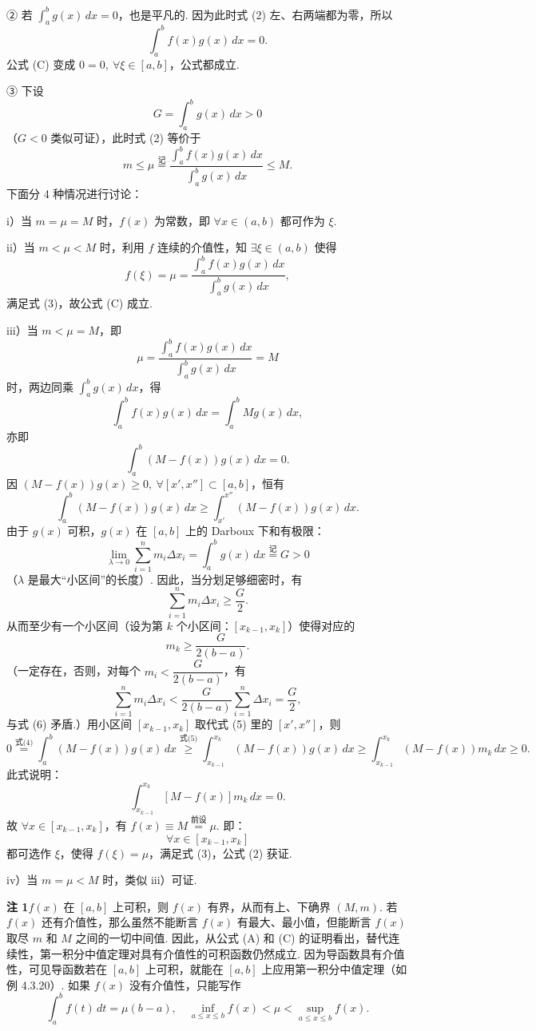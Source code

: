 \documentclass[UTF8,12pt,a4paper,fontset=fandol]{ctexart}
\begin{document}
② 若 $\displaystyle\int_a^b g(x)\,dx=0$，也是平凡的. 因为此时式 (2) 左、右两端都为零，所以
\[
\int_a^b f(x)g(x)\,dx=0.
\]
公式 (C) 变成 $0=0,\ \forall\xi\in[a,b]$，公式都成立.

③ 下设
\[
G=\int_a^b g(x)\,dx>0
\]
（$G<0$ 类似可证），此时式 (2) 等价于
\[
m\le \mu\stackrel{\text{记}}{=}
\frac{\displaystyle\int_a^b f(x)g(x)\,dx}{\displaystyle\int_a^b g(x)\,dx}\le M.
\tag{3}
\]
下面分 4 种情况进行讨论：

i）当 $m=\mu=M$ 时，$f(x)$ 为常数，即 $\forall x\in(a,b)$ 都可作为 $\xi$.

ii）当 $m<\mu<M$ 时，利用 $f$ 连续的介值性，知 $\exists\xi\in(a,b)$ 使得
\[
f(\xi)=\mu=
\frac{\displaystyle\int_a^b f(x)g(x)\,dx}{\displaystyle\int_a^b g(x)\,dx},
\]
满足式 (3)，故公式 (C) 成立.

iii）当 $m<\mu=M$，即
\[
\mu=\frac{\displaystyle\int_a^b f(x)g(x)\,dx}{\displaystyle\int_a^b g(x)\,dx}=M
\]
时，两边同乘 $\displaystyle\int_a^b g(x)\,dx$，得
\[
\int_a^b f(x)g(x)\,dx=\int_a^b Mg(x)\,dx,
\]
亦即
\[
\int_a^b(M-f(x))g(x)\,dx=0.
\tag{4}
\]
因 $(M-f(x))g(x)\ge0,\ \forall[x',x'']\subset[a,b]$，恒有
\[
\int_a^b(M-f(x))g(x)\,dx\ge
\int_{x'}^{x''}(M-f(x))g(x)\,dx.
\tag{5}
\]
由于 $g(x)$ 可积，$g(x)$ 在 $[a,b]$ 上的 Darboux 下和有极限：
\[
\lim_{\lambda\to0}\sum_{i=1}^n m_i\Delta x_i
=\int_a^b g(x)\,dx\stackrel{\text{记}}{=}G>0
\]
（$\lambda$ 是最大“小区间”的长度）. 因此，当分划足够细密时，有
\[
\sum_{i=1}^n m_i\Delta x_i\ge\frac G2.
\tag{6}
\]
从而至少有一个小区间（设为第 $k$ 个小区间：$[x_{k-1},x_k]$）使得对应的
\[
m_k\ge\frac{G}{2(b-a)}.
\tag{7}
\]
（一定存在，否则，对每个 $m_i<\dfrac{G}{2(b-a)}$，有
\[
\sum_{i=1}^n m_i\Delta x_i<
\frac{G}{2(b-a)}\sum_{i=1}^n\Delta x_i=\frac G2,
\]
与式 (6) 矛盾.）用小区间 $[x_{k-1},x_k]$ 取代式 (5) 里的 $[x',x'']$，则
\[
0\stackrel{\text{式(4)}}{=}\int_a^b(M-f(x))g(x)\,dx
\stackrel{\text{式(5)}}{\ge}
\int_{x_{k-1}}^{x_k}(M-f(x))g(x)\,dx
\ge\int_{x_{k-1}}^{x_k}(M-f(x))m_k\,dx\ge0.
\]
此式说明：
\[
\int_{x_{k-1}}^{x_k}[M-f(x)]m_k\,dx=0.
\]
故 $\forall x\in[x_{k-1},x_k]$，有 $f(x)\equiv M\stackrel{\text{前设}}{=}\mu$. 即：
\[
\forall x\in[x_{k-1},x_k]
\]
都可选作 $\xi$，使得 $f(\xi)=\mu$，满足式 (3)，公式 (2) 获证.

iv）当 $m=\mu<M$ 时，类似 iii）可证.

\noindent\textbf{注 1}\quad $f(x)$ 在 $[a,b]$ 上可积，则 $f(x)$ 有界，从而有上、下确界 $(M,m)$. 若 $f(x)$ 还有介值性，那么虽然不能断言 $f(x)$ 有最大、最小值，但能断言 $f(x)$ 取尽 $m$ 和 $M$ 之间的一切中间值. 因此，从公式 (A) 和 (C) 的证明看出，替代连续性，第一积分中值定理对具有介值性的可积函数仍然成立. 因为导函数具有介值性，可见导函数若在 $[a,b]$ 上可积，就能在 $[a,b]$ 上应用第一积分中值定理（如例 4.3.20）. 如果 $f(x)$ 没有介值性，只能写作
\[
\int_a^b f(t)\,dt=\mu(b-a),\quad
\inf_{a\le x\le b}f(x)<\mu<\sup_{a\le x\le b}f(x).
\]
\end{document}

